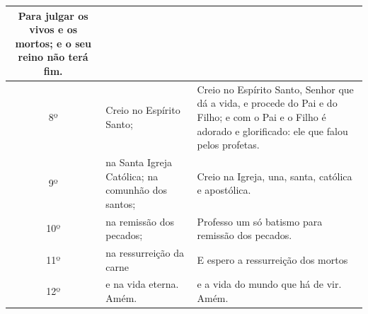 \begin{tabular}{|c|p{4.5cm}|p{5.5cm}|}
        Para julgar os vivos e os mortos;
        e o seu reino não terá fim.
 \\ \hline
        8º & Creio no Espírito Santo; & Creio no Espírito Santo,
        Senhor que dá a vida,
        e procede do Pai e do Filho;
        e com o Pai e o Filho é adorado e glorificado:
        ele que falou pelos profetas.
 \\ \hline
        9º & na Santa Igreja Católica; na comunhão dos santos; & Creio na Igreja,
        una, santa, católica e apostólica.
 \\ \hline
        10º & na remissão dos pecados; & Professo um só batismo 
        para remissão dos pecados.
 \\ \hline
        11º & na ressurreição da carne & E espero a ressurreição dos mortos \\ \hline
        12º & e na vida eterna. Amém. & e a vida do mundo que há de vir. Amém. \\ \hline
    \end{tabular}
